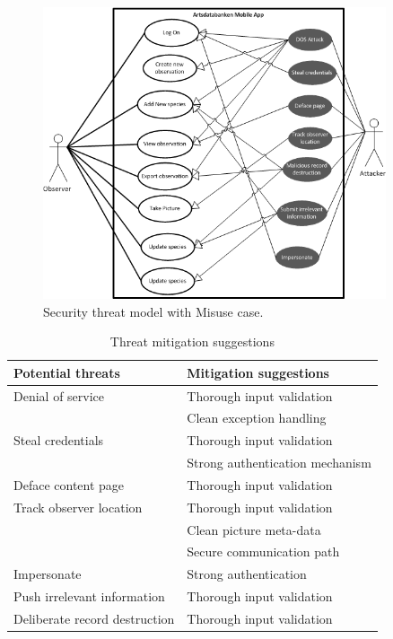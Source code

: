 \begin{figure}[htb]
	\centering
    \includegraphics[width=0.9\textwidth]{reqspec/misusecase.png}
	\caption{Security threat model with Misuse case.}
	\label{fig:misusecase}
\end{figure}

\begin{table}[htb]
	\centering
    \begin{tabular}{| l | l |}
		\hline
		Potential threats & Mitigation suggestions \\
		\hline \hline
		Denial of service	& Thorough input validation \\& Clean exception handling \\
		Steal credentials	& Thorough input validation\\	& Strong authentication mechanism \\
        Deface content page & Thorough input validation\\
        Track observer location & Thorough input validation\\ & Clean picture meta-data\\ & Secure communication path\\
        Impersonate & Strong authentication\\
        Push irrelevant information & Thorough input validation\\
        Deliberate record destruction & Thorough input validation\\

		\hline
    \end{tabular}
  \caption{Threat mitigation suggestions}
\end{table}
